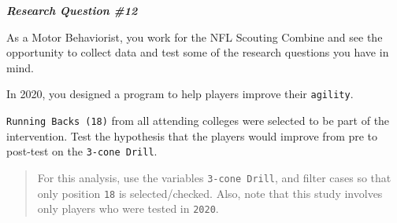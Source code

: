 \documentclass[11pt,]{article}
\begin{document}
\textbf{\emph{Research Question \#12}}

As a Motor Behaviorist, you work for the NFL Scouting Combine and see
the opportunity to collect data and test some of the research questions
you have in mind.

In 2020, you designed a program to help players improve their
\texttt{agility}.

\texttt{Running\ Backs\ (18)} from all attending colleges were selected
to be part of the intervention. Test the hypothesis that the players
would improve from pre to post-test on the \texttt{3-cone\ Drill}.

\begin{quote}
For this analysis, use the variables \texttt{3-cone\ Drill}, and filter
cases so that only position \texttt{18} is selected/checked. Also, note
that this study involves only players who were tested in \texttt{2020}.
\end{quote}
\end{document}
